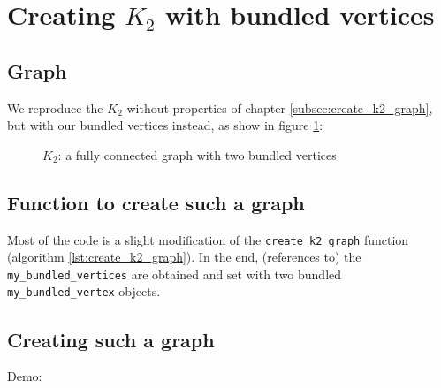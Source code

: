 \section{Creating $K_{2}$ with bundled vertices}
\label{subsec:create_bundled_vertices_k2_graph}

\subsection{Graph}

We reproduce the $K_{2}$ without properties of 
chapter \ref{subsec:create_k2_graph}, 
but with our bundled vertices instead, 
as show in figure \ref{fig:bundled_vertices_k2_graph}:

%
%
\begin{figure}
  \caption{
    $K_{2}$: a fully connected graph with two bundled vertices
  }
  \label{fig:bundled_vertices_k2_graph}
\end{figure}

\subsection{Function to create such a graph}



Most of the code is a slight modification of the 
\verb;create_k2_graph; function 
(algorithm \ref{lst:create_k2_graph}).
In the end, (references to) the \verb;my_bundled_vertices; 
are obtained and set with two bundled \verb;my_bundled_vertex; objects.

\subsection{Creating such a graph}

Demo:

